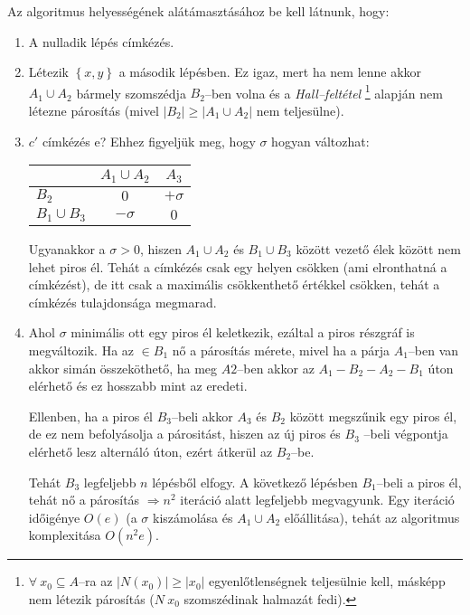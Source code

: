 Az algoritmus helyességének alátámasztásához be kell látnunk, hogy:

\begin{enumerate}
  \item A nulladik lépés címkézés.
  \item Létezik $\left\{x,y\right\}$ a második lépésben. Ez igaz, mert ha nem
  lenne akkor $A_1 \cup A_2$ bármely szomszédja $B_2$--ben volna és a
  \emph{Hall--feltétel} \footnote{$ \forall~x_0 \subseteq A$--ra az $|N(x_0)|
  \geq |x_0|$ egyenlőtlenségnek teljesülnie kell, másképp nem létezik párosítás
  ($N~x_0$ szomszédinak halmazát fedi).} alapján nem létezne párosítás 
  (mivel $|B_2| \geq |A_1 \cup A_2|$ nem teljesülne).
  \item $c'$ címkézés e? Ehhez figyeljük meg, hogy $\sigma$ hogyan változhat:
  
  \begin{tabular}{ l |  c c }
                  & $A_1 \cup A_2$ & $A_3$ \\
                  \hline
  $B_2$           & $0$            & $+\sigma$ \\
  $B_1 \cup B_3$ & $-\sigma$      & $0$ \\
  \end{tabular}
  
  Ugyanakkor a $\sigma > 0 $, hiszen $A_1 \cup A_2$ és $B_1 \cup B_3$ között
  vezető élek között nem lehet piros él. Tehát a címkézés csak egy helyen
  csökken (ami elronthatná a címkézést), de itt csak a maximális csökkenthető értékkel
  csökken, tehát a címkézés tulajdonsága megmarad.
 
  \item Ahol $\sigma$ minimális ott egy piros él keletkezik, ezáltal a piros
  részgráf is megváltozik. Ha az $\in B_1$ nő a párosítás mérete, mivel ha a
  párja $A_1$--ben van akkor simán összeköthető, ha meg $A2$--ben akkor az
  $A_1-B_2-A_2-B_1$ úton elérhető és ez hosszabb mint az eredeti. 
  
  Ellenben, ha a piros él $B_3$--beli akkor $A_3$ és $B_2$ között megszűnik egy
  piros él, de ez nem befolyásolja a párositást, hiszen az új piros és $B_3$
  --beli végpontja elérhető lesz alternáló úton, ezért átkerül az $B_2$--be.
  
  Tehát $B_3$ legfeljebb $n$ lépésből elfogy. A  következő lépésben $B_1$--beli
  a piros él, tehát nő a párosítás $\Rightarrow n^2$ iteráció alatt legfeljebb
  megvagyunk. Egy iteráció időigénye $O(e)$ (a $\sigma$ kiszámolása és $A_1 \cup
  A_2$ előállitása), tehát az algoritmus komplexitása $O(n^2e)$.
  \end{enumerate}